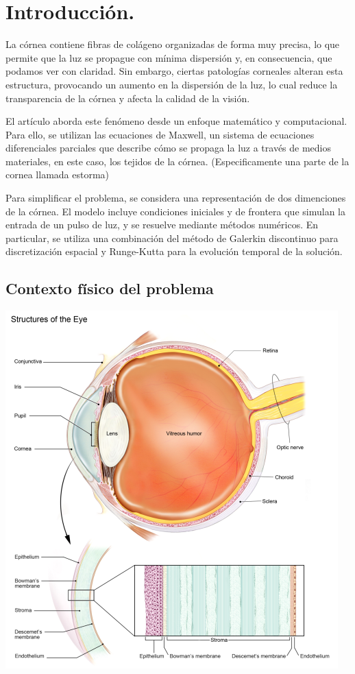 \documentclass[10pt,a4paper]{article}
\begin{document}
\section{Introducción.}

La córnea contiene fibras de colágeno organizadas de forma muy precisa, lo que permite que la luz se propague con mínima dispersión y, en consecuencia, que podamos ver con claridad. Sin embargo, ciertas patologías corneales alteran esta estructura, provocando un aumento en la dispersión de la luz, lo cual reduce la transparencia de la córnea y afecta la calidad de la visión.

El artículo aborda este fenómeno desde un enfoque matemático y computacional. Para ello, se utilizan las ecuaciones de Maxwell, un sistema de ecuaciones diferenciales parciales que describe cómo se propaga la luz a través de medios materiales, en este caso, los tejidos de la córnea. (Especificamente una parte de la cornea llamada estorma)

Para simplificar el problema, se considera una representación de dos dimenciones de la córnea. El modelo incluye condiciones iniciales y de frontera que simulan la entrada de un pulso de luz, y se resuelve mediante métodos numéricos. En particular, se utiliza una combinación del método de Galerkin discontinuo para discretización espacial y Runge-Kutta para la evolución temporal de la solución.

\subsection{Contexto físico del problema}

\begin{center}
	\includegraphics[scale=0.5]{partes-ojo.png} 
\end{center}
\end{document}
